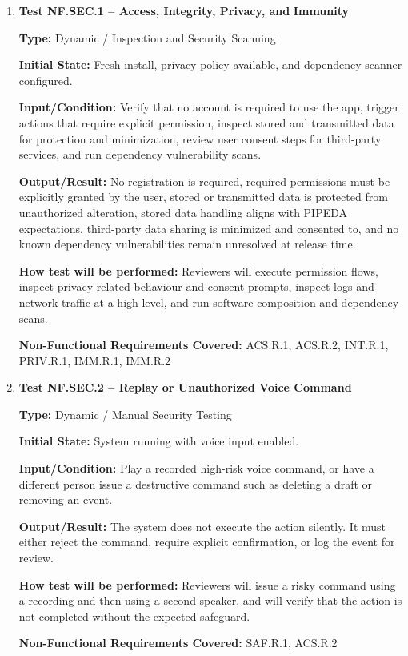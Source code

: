 \documentclass[12pt, titlepage]{article}
\begin{document}
\begin{enumerate}

\item \textbf{Test NF.SEC.1 -- Access, Integrity, Privacy, and}
\textbf{Immunity}

\textbf{Type:} Dynamic / Inspection and Security Scanning

\textbf{Initial State:} Fresh install, privacy policy available, and
dependency scanner configured.

\textbf{Input/Condition:} Verify that no account is required to use the
app, trigger actions that require explicit permission, inspect stored
and transmitted data for protection and minimization, review user
consent steps for third-party services, and run dependency
vulnerability scans.

\textbf{Output/Result:} No registration is required, required
permissions must be explicitly granted by the user, stored or
transmitted data is protected from unauthorized alteration, stored data
handling aligns with PIPEDA expectations, third-party data sharing is
minimized and consented to, and no known dependency vulnerabilities
remain unresolved at release time.

\textbf{How test will be performed:} Reviewers will execute permission
flows, inspect privacy-related behaviour and consent prompts, inspect
logs and network traffic at a high level, and run software composition
and dependency scans.

\textbf{Non-Functional Requirements Covered:} ACS.R.1, ACS.R.2, INT.R.1,
PRIV.R.1, IMM.R.1, IMM.R.2

\item \textbf{Test NF.SEC.2 -- Replay or Unauthorized Voice Command}

\textbf{Type:} Dynamic / Manual Security Testing

\textbf{Initial State:} System running with voice input enabled.

\textbf{Input/Condition:} Play a recorded high-risk voice command, or
have a different person issue a destructive command such as deleting a
draft or removing an event.

\textbf{Output/Result:} The system does not execute the action silently.
It must either reject the command, require explicit confirmation, or log
the event for review.

\textbf{How test will be performed:} Reviewers will issue a risky
command using a recording and then using a second speaker, and will
verify that the action is not completed without the expected safeguard.

\textbf{Non-Functional Requirements Covered:} SAF.R.1, ACS.R.2

\end{enumerate}
\end{document}

